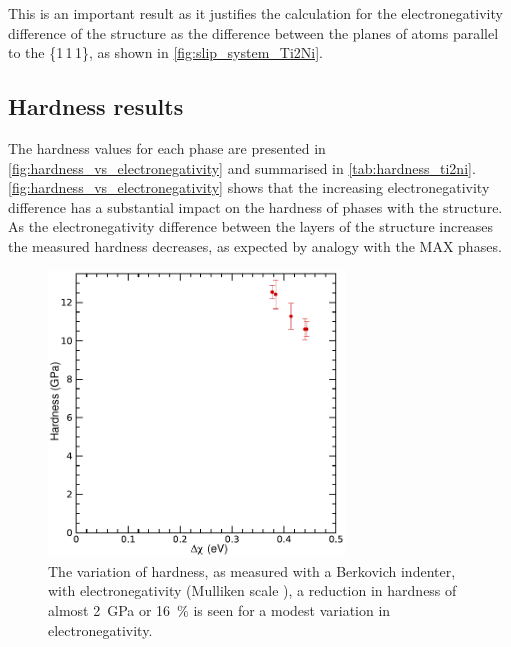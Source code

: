 This is an important result as it justifies the calculation for the electronegativity difference of the structure as the difference between the planes of atoms parallel to the \{1\,1\,1\}, as shown in \autoref{fig:slip_system_Ti2Ni}.






\subsection{Hardness results}



The hardness values for each phase are presented in \autoref{fig:hardness_vs_electronegativity} and summarised in \autoref{tab:hardness_ti2ni}. \autoref{fig:hardness_vs_electronegativity} shows that the increasing electronegativity difference has a substantial impact on the hardness of phases with the  structure. As the electronegativity difference between the layers of the  structure increases the measured hardness decreases, as expected by analogy with the MAX phases. 


\begin{figure}[!htb]
\centering
\captionsetup{width=0.7\textwidth}
\includegraphics[width=0.7\textwidth]{Ti2Ni_H_vs_dX}
\caption[The variation of hardness with electronegativity difference in .]{The variation of hardness, as measured with a Berkovich indenter, with electronegativity (Mulliken scale \cite{Mulliken1934}), a reduction in hardness of almost \SI{2}{\giga\pascal} or \SI{16}{\percent} is seen for a modest variation in electronegativity.\label{fig:hardness_vs_electronegativity}}
\end{figure}



